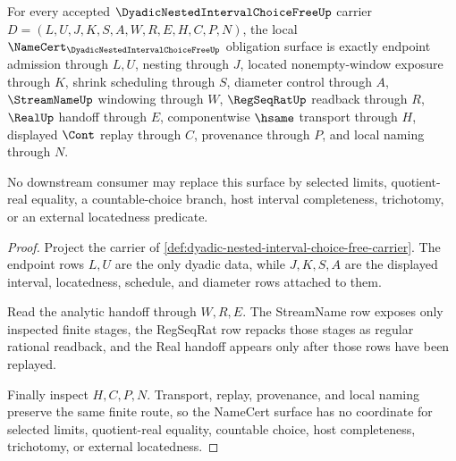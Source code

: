 \begin{theorem}\label{thm:dyadic-nested-interval-choice-free-namecert-obligations}
For every accepted $\DyadicNestedIntervalChoiceFreeUp$ carrier $D=(L,U,J,K,S,A,W,R,E,H,C,P,N)$, the local $\NameCert_{\DyadicNestedIntervalChoiceFreeUp}$ obligation surface is exactly endpoint admission through $L,U$, nesting through $J$, located nonempty-window exposure through $K$, shrink scheduling through $S$, diameter control through $A$, $\StreamNameUp$ windowing through $W$, $\RegSeqRatUp$ readback through $R$, $\RealUp$ handoff through $E$, componentwise $\hsame$ transport through $H$, displayed $\Cont$ replay through $C$, provenance through $P$, and local naming through $N$.

No downstream consumer may replace this surface by selected limits, quotient-real equality, a countable-choice branch, host interval completeness, trichotomy, or an external locatedness predicate.
\end{theorem}
\begin{proof}
Project the carrier of \autoref{def:dyadic-nested-interval-choice-free-carrier}. The endpoint rows $L,U$ are the only dyadic data, while $J,K,S,A$ are the displayed interval, locatedness, schedule, and diameter rows attached to them.

Read the analytic handoff through $W,R,E$. The StreamName row exposes only inspected finite stages, the RegSeqRat row repacks those stages as regular rational readback, and the Real handoff appears only after those rows have been replayed.

Finally inspect $H,C,P,N$. Transport, replay, provenance, and local naming preserve the same finite route, so the NameCert surface has no coordinate for selected limits, quotient-real equality, countable choice, host completeness, trichotomy, or external locatedness.
\end{proof}

